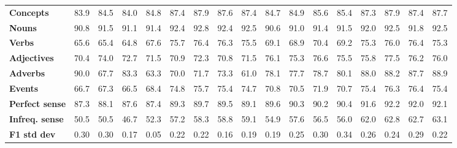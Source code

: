 \documentclass[11pt,a4paper]{article}
\begin{document}
\begin{table*}[!t]
{\begin{tabular}{l|rrrr|rrrr|rrrr|rrrr}
\bf Concepts & 83.9             & 84.5             & 84.0             & 84.8  & 87.4             & 87.9             & 87.6            & 87.4       & 84.7             & 84.9             & 85.6             & 85.4        & 87.3             & 87.9             & 87.4             & 87.7  \\           
\quad \bf Nouns & 90.8             & 91.5             & 91.1             & 91.4 & 92.4             & 92.8             & 92.4            & 92.5  & 90.6             & 91.0             & 91.4             & 91.5               & 92.0             & 92.5             & 91.8             & 92.5   \\          
\quad \bf Verbs & 65.6             & 65.4             & 64.8             & 67.6  & 75.7             & 76.4             & 76.3            & 75.5  & 69.1             & 68.9             & 70.4             & 69.2              & 75.3             & 76.0             & 76.4             & 75.3   \\          
\quad \bf Adjectives & 70.4             & 74.0             & 72.7             & 71.5  & 70.9             & 72.3             & 70.8            & 71.5  & 76.1             & 75.3             & 76.6             & 75.5          & 75.8             & 77.5             & 76.2             & 76.0   \\          
\quad \bf Adverbs & 90.0             & 67.7             & 83.3             & 63.3 & 70.0             & 71.7             & 73.3            & 61.0  & 78.1             & 77.7             & 78.7             & 80.1              & 88.0             & 88.2             & 87.7             & 88.9   \\          
\quad \bf Events & 66.7             & 67.3             & 66.5             & 68.4  & 74.8             & 75.7             & 75.4            & 74.7 & 70.8             & 70.5             & 71.9             & 70.7             & 75.4             & 76.3             & 76.4             & 75.4  \\     
\midrule
\bf Perfect sense & 87.3             & 88.1             & 87.6             & 87.4  & 89.3             & 89.7             & 89.5            & 89.1   & 89.6             & 90.3             & 90.2             & 90.4        & 91.6             & 92.2             & 92.0             & 92.1  \\  
\bf Infreq. sense & 50.5 & 50.5 & 46.7 & 52.3 & 57.2 & 58.3 & 58.8 & 59.1 & 54.9 & 57.6 & 56.5 & 56.0      &   62.0          &   62.8          &    62.7          & 63.1   \\
\midrule
\bf F1 std dev & 0.30              & 0.30              & 0.17             & 0.05  & 0.22             & 0.22             & 0.16            & 0.19    & 0.19 & 0.25 & 0.30 & 0.34         & 0.26             & 0.24             & 0.29             & 0.22  \\           

\end{tabular}}
\end{table*}
\end{document}
